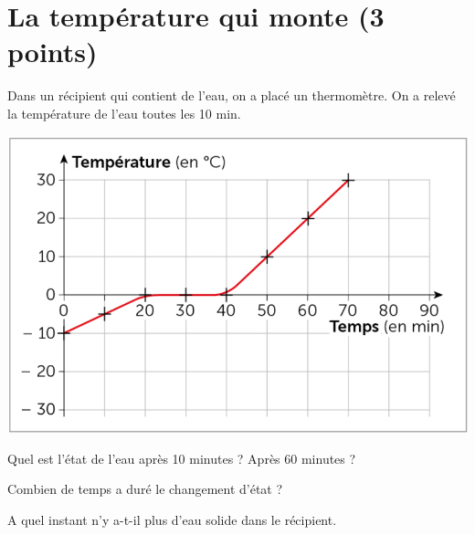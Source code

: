 \section{La température qui monte (3 points)}\label{ex:fusion}

Dans un récipient qui contient de l'eau, on a placé un thermomètre. On a relevé la température de l'eau toutes les 10 min.

\begin{center}
	\includegraphics[scale=0.4]{./img/courbe}
\end{center}

\begin{questions}
	\question[1] Quel est l'état de l'eau après 10 minutes ? Après 60 minutes ?
	
	\question[1] Combien de temps a duré le changement d'état ?
	
	\question[1] A quel instant n'y a-t-il plus d'eau solide dans le récipient. 
\end{questions}